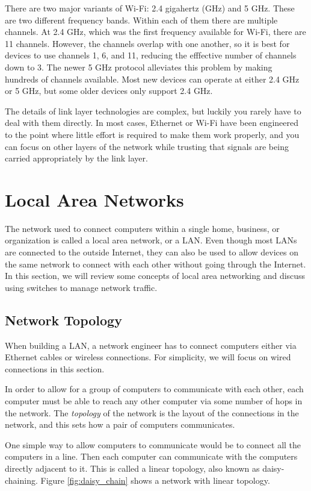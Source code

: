 There are two major variants of Wi-Fi: 2.4 gigahertz (GHz) and 5 GHz. These are two different frequency bands. Within each of them there are multiple channels. At 2.4 GHz, which was the first frequency available for Wi-Fi, there are 11 channels. However, the channels overlap with one another, so it is best for devices to use channels 1, 6, and 11, reducing the efffective number of channels down to 3. The newer 5 GHz protocol alleviates this problem by making hundreds of channels available. Most new devices can operate at either 2.4 GHz or 5 GHz, but some older devices only support 2.4 GHz.

The details of link layer technologies are complex, but luckily you rarely have to deal with them directly. In most cases, Ethernet or Wi-Fi have been engineered to the point where little effort is required to make them work properly, and you can focus on other layers of the network while trusting that signals are being carried appropriately by the link layer.

\section{Local Area Networks}

The network used to connect computers within a single home, business, or organization is called a local area network, or a LAN. Even though most LANs are connected to the outside Internet, they can also be used to allow devices on the same network to connect with each other without going through the Internet. In this section, we will review some concepts of local area networking and discuss using switches to manage network traffic.

\subsection{Network Topology}

When building a LAN, a network engineer has to connect computers either via Ethernet cables or wireless connections. For simplicity, we will focus on wired connections in this section.

In order to allow for a group of computers to communicate with each other, each computer must be able to reach any other computer via some number of hops in the network. The \emph{topology} of the network is the layout of the connections in the network, and this sets how a pair of computers communicates. 

One simple way to allow computers to communicate would be to connect all the computers in a line. Then each computer can communicate with the computers directly adjacent to it. This is called a linear topology, also known as daisy-chaining. Figure \ref{fig:daisy_chain} shows a network with linear topology.

